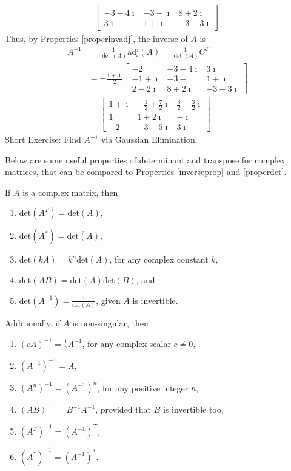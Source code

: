 \begin{exmp}
\begin{align*}
\begin{bmatrix}
-3-4\imath & -3-\imath & 8+2\imath \\
3\imath & 1+\imath & -3-3\imath
\end{bmatrix}
\end{align*}
Thus, by Properties \ref{properinvadj}, the inverse of $A$ is
\begin{align*}
A^{-1} &= \frac{1}{\det(A)} \text{adj}(A) = \frac{1}{\det(A)} C^T \\
&= -\frac{1+\imath}{2} 
\begin{bmatrix}
-2 & -3-4\imath & 3\imath \\
-1+\imath & -3-\imath & 1+\imath \\
2-2\imath & 8+2\imath & -3-3\imath
\end{bmatrix} \\
&= 
\begin{bmatrix}
1+\imath & -\frac{1}{2}+\frac{7}{2}\imath & \frac{3}{2}-\frac{3}{2}\imath \\
1 & 1+2\imath & -\imath \\
-2 & -3-5\imath & 3\imath
\end{bmatrix} 
\end{align*}
Short Exercise: Find $A^{-1}$ via Gaussian Elimination.
\end{exmp}

Below are some useful properties of determinant and transpose for complex matrices, that can be compared to Properties \ref{inverseprop} and \ref{properdet}.
\begin{proper}
If $A$ is a complex matrix, then
\begin{enumerate}
\item $\text{det}(A^T) = \text{det}(A)$,
\item $\text{det}(A^*) = \overline{\text{det}(A)}$,
\item $\text{det}(kA) = k^n \text{det}(A)$, for any complex constant $k$,
\item $\text{det}(AB) = \text{det}(A)\text{det}(B)$, and
\item $\text{det}(A^{-1}) = \frac{1}{\text{det}(A)}$, given $A$ is invertible.
\end{enumerate}
Additionally, if $A$ is non-singular, then
\begin{enumerate}
\item $(cA)^{-1} = \frac{1}{c}A^{-1}$, for any complex scalar $c \neq 0$,
\item $(A^{-1})^{-1} = A$,
\item $(A^n)^{-1} = (A^{-1})^n$, for any positive integer $n$,
\item $(AB)^{-1} = B^{-1}A^{-1}$, provided that $B$ is invertible too,
\item $(A^T)^{-1} = (A^{-1})^T$,
\item $(A^*)^{-1} = (A^{-1})^*$.
\end{enumerate}
\end{proper}

